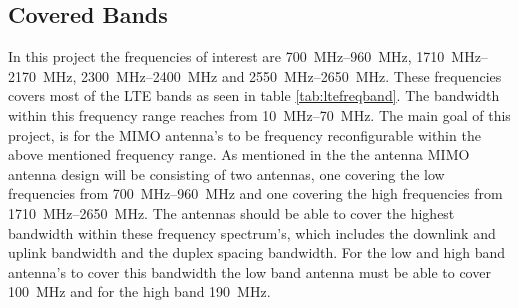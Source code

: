 \subsection{Covered Bands}
In this project the frequencies of interest are \SIrange{700}{960}{MHz}, \SIrange{1710}{2170}{MHz}, \SIrange{2300}{2400}{MHz} and \SIrange{2550}{2650}{MHz}. These frequencies covers most of the LTE bands as seen in table \ref{tab:ltefreqband}. The bandwidth within this frequency range reaches from \SIrange{10}{70}{MHz}. The main goal of this project, is for the MIMO antenna's to be frequency reconfigurable within the above mentioned frequency range. As mentioned in the  the antenna MIMO antenna design will be consisting of two antennas, one covering the low frequencies from \SIrange{700}{960}{MHz} and one covering the high frequencies from \SIrange{1710}{2650}{MHz}. The antennas should be able to cover the highest bandwidth within these frequency spectrum's, which includes the downlink and uplink bandwidth and the duplex spacing bandwidth. For the low and high band antenna's to cover this bandwidth the low band antenna must be able to cover \SI{100}{MHz} and for the high band \SI{190}{MHz}.  

